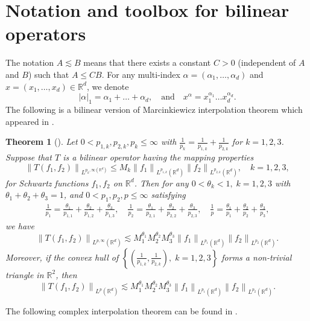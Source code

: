 \documentclass[a4paper,reqno]{amsart}
\newcommand{\R}{{\mathbb R}}       %
\newtheorem{theorem}{Theorem}[section]
\theoremstyle{definition}
\numberwithin{equation}{section}
\begin{document}
\section{Notation and toolbox for bilinear operators}
The notation $A\lesssim B$ means that there exists a constant $C>0$ (independent of $A$ and $B$) such that $A\leq CB$.
For any multi-index $\alpha=(\alpha_1,\dots,\alpha_d)$ and $x=(x_1,\dots,x_d)\in\R^d$, we denote
\[|\alpha|_1=\alpha_1+\dots+\alpha_d,\quad\text{and}\quad x^\alpha=x_1^{\alpha_1}\dots x_d^{\alpha_d}.\]
The following is a bilinear version of Marcinkiewicz interpolation theorem which appeared in \cite[Lemma 2.1]{HP2023}.
\begin{theorem}[\cite{HP2023}]\label{realinterpolation}
	Let $0<p_{1,k},p_{2,k},p_{k} \leq \infty$ with $\frac{1}{p_{k}}=\frac{1}{p_{1,k}}+\frac{1}{p_{2,k}}$ for $k=1,2,3$. Suppose that $T$ is a bilinear operator having the mapping properties
	\[\left\|T\left(f_1, f_2\right)\right\|_{L^{p_{k}, \infty\left(\mathbb{R}^d\right)}} \leq M_k\left\|f_1\right\|_{L^{p_{1,k}}\left(\mathbb{R}^d\right)}\left\|f_2\right\|_{L^{p_{2,k}}\left(\mathbb{R}^d\right)}, \quad k=1,2,3,\]
	for Schwartz functions $f_1, f_2$ on $\mathbb{R}^d$. Then for any $0<\theta_k<1,\;k=1,2,3$ with $\theta_1+\theta_2+\theta_3=1$, and $0<p_1, p_2, p \leq \infty$ satisfying
	\begin{align*}
		\frac{1}{p_1}=\frac{\theta_1}{p_{1,1}}+\frac{\theta_2}{p_{1,2}}+\frac{\theta_3}{p_{1,3}}, \quad \frac{1}{p_2}=\frac{\theta_1}{p_{2,1}}+\frac{\theta_2}{p_{2,2}}+\frac{\theta_3}{p_{2,3}}, \quad \frac{1}{p}=\frac{\theta_1}{p_1}+\frac{\theta_2}{p_2}+\frac{\theta_3}{p_3},
	\end{align*}
	we have
	\[\left\|T\left(f_1, f_2\right)\right\|_{L^{p, \infty}\left(\mathbb{R}^d\right)} \lesssim M_1^{\theta_1} M_2^{\theta_2} M_3^{\theta_3}\left\|f_1\right\|_{L^{p_1}\left(\mathbb{R}^d\right)}\left\|f_2\right\|_{L^{p_2}\left(\mathbb{R}^d\right)}.\]
	Moreover, if the convex hull of $\left\{\left(\frac{1}{p_{1,k}},\frac{1}{p_{2,k}}\right),\;k=1,2,3\right\}$ forms a non-trivial triangle in $\mathbb{R}^2$, then
	\[\left\|T\left(f_1, f_2\right)\right\|_{L^p\left(\mathbb{R}^d\right)} \lesssim M_1^{\theta_1} M_2^{\theta_2} M_3^{\theta_3}\left\|f_1\right\|_{L^{p_1}\left(\mathbb{R}^d\right)}\left\|f_2\right\|_{L^{p_2}\left(\mathbb{R}^d\right)}.\]
\end{theorem}
The following complex interpolation theorem can be found in \cite[Corollary 7.2.11]{GrafakosmodernFA}.
\end{document}
